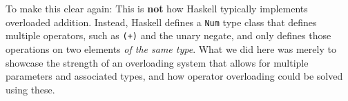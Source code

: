 To make this clear again: This is \textbf{not} how Haskell typically implements overloaded addition. Instead, Haskell defines a \verb|Num| type class that defines multiple operators, such as \verb|(+)| and the unary negate, and only defines those operations on two elements \textit{of the same type}. What we did here was merely to showcase the strength of an overloading system that allows for multiple parameters and associated types, and how operator overloading could be solved using these.

